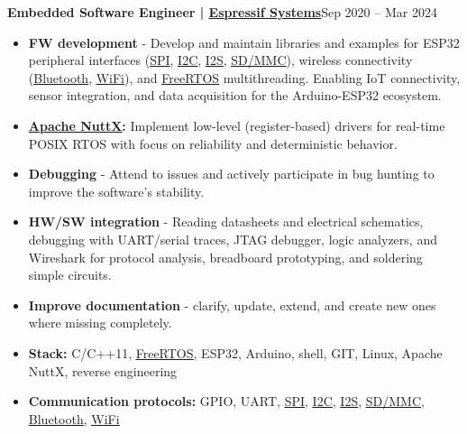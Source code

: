 \documentclass[10pt,a4paper]{article}
\let\plainhref\href
\renewcommand{\href}[2]{\plainhref{#1}{\underline{#2}}}
\newcommand{\role}[3]{\par\addvspace{5pt}\noindent\textbf{#1 | #2}\hfill #3\par}
\newcommand{\cvitem}[2]{\item \textbf{#1} - #2}
\newcommand{\cvitemcolon}[2]{\item \textbf{#1:} #2}
\newcommand{\githubsearch}[2]{\href{#1}{#2}}
\begin{document}
\role{Embedded Software Engineer}{\href{https://www.espressif.com/}{Espressif Systems}}{Sep 2020 – Mar 2024}
\begin{itemize}
  \cvitem{FW development}{Develop and maintain libraries and examples for ESP32 peripheral interfaces (\githubsearch{https://github.com/search?q=author\%3APilnyTomas+is\%3Apr+is\%3Amerged+SPI\&type=pullrequests}{SPI}, \githubsearch{https://github.com/search?q=author\%3APilnyTomas+is\%3Apr+is\%3Amerged+I2C\&type=pullrequests}{I2C}, \githubsearch{https://github.com/search?q=author\%3APilnyTomas+is\%3Apr+is\%3Amerged+I2S\&type=pullrequests}{I2S}, \githubsearch{https://github.com/search?q=author\%3APilnyTomas+is\%3Apr\%3Amerged+SD\&type=pullrequests}{SD/MMC}), wireless connectivity (\githubsearch{https://github.com/search?q=author\%3APilnyTomas+is\%3Apr+is\%3Amerged+Bluetooth\&type=pullrequests}{Bluetooth}, \githubsearch{https://github.com/search?q=author\%3APilnyTomas+is\%3Apr+is\%3Amerged+WiFi\&type=pullrequests}{WiFi}), and \githubsearch{https://github.com/search?q=author\%3APilnyTomas+is\%3Apr+is\%3Amerged+FreeRTOS\&type=pullrequests}{FreeRTOS} multithreading. Enabling IoT connectivity, sensor integration, and data acquisition for the Arduino-ESP32 ecosystem.}
  \cvitemcolon{\href{https://nuttx.apache.org/}{Apache NuttX}}{Implement low-level (register-based) drivers for real-time POSIX RTOS with focus on reliability and deterministic behavior.}
  \cvitem{Debugging}{Attend to issues and actively participate in bug hunting to improve the software's stability.}
  \cvitem{HW/SW integration}{Reading datasheets and electrical schematics, debugging with UART/serial traces, JTAG debugger, logic analyzers, and Wireshark for protocol analysis, breadboard prototyping, and soldering simple circuits.}
  \cvitem{Improve documentation}{clarify, update, extend, and create new ones where missing completely.}
  \cvitemcolon{Stack}{C/C++11, \githubsearch{https://github.com/search?q=author\%3APilnyTomas+is\%3Apr+is\%3Amerged+FreeRTOS\&type=pullrequests}{FreeRTOS}, ESP32, Arduino, shell, GIT, Linux, Apache NuttX, reverse engineering}
  \cvitemcolon{Communication protocols}{GPIO, UART, \githubsearch{https://github.com/search?q=author\%3APilnyTomas+is\%3Apr+is\%3Amerged+SPI\&type=pullrequests}{SPI}, \githubsearch{https://github.com/search?q=author\%3APilnyTomas+is\%3Apr+is\%3Amerged+I2C\&type=pullrequests}{I2C}, \githubsearch{https://github.com/search?q=author\%3APilnyTomas+is\%3Apr+is\%3Amerged+I2S\&type=pullrequests}{I2S}, \githubsearch{https://github.com/search?q=author\%3APilnyTomas+is\%3Apr+is\%3Amerged+SD\&type=pullrequests}{SD/MMC}, \githubsearch{https://github.com/search?q=author\%3APilnyTomas+is\%3Apr+is\%3Amerged+Bluetooth\&type=pullrequests}{Bluetooth}, \githubsearch{https://github.com/search?q=author\%3APilnyTomas+is\%3Apr+is\%3Amerged+WiFi\&type=pullrequests}{WiFi}}
\end{itemize}
\end{document}
